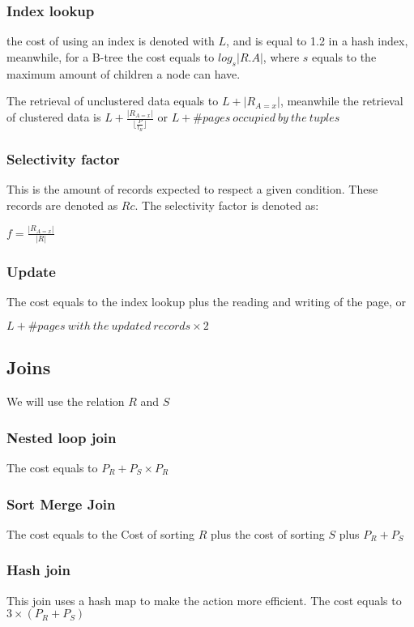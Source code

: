\documentclass[12pt, a4paper]{article}
\begin{document}
\subsubsection*{Index lookup}
the cost of using an index is denoted with $L$, and is equal to 1.2 in a hash index, meanwhile, for a B-tree the cost equals 
to $log_{s}|R.A|$, where $s$ equals to the maximum amount of children a node can have.

The retrieval of unclustered data equals to $L + |R_{A=x}|$, meanwhile the retrieval of clustered data is 
$L + \frac{|R_{A=x}|}{\lfloor\frac{P}{t_{R}}\rfloor}$ or $L + \# pages\ occupied\ by\ the\ tuples$

\subsubsection*{Selectivity factor}
This is the amount of records expected to respect a given condition. These records are denoted as $Rc$. The selectivity
factor is denoted as:
\begin{center}
    $f = \frac{|R_{A=x}|}{|R|}$ 
\end{center}

\subsubsection*{Update}
The cost equals to the index lookup plus the reading and writing of the page, or 
\begin{center}
    $L + \# pages\ with\ the\ updated\ records\times 2$    
\end{center}

\subsection{Joins}
We will use the relation $R$ and $S$
\subsubsection*{Nested loop join}
The cost equals to $P_{R}+P_{S}\times P_{R}$

\subsubsection{Sort Merge Join}
The cost equals to the Cost of sorting $R$ plus the cost of sorting $S$ plus $P_{R}+P_{S}$

\subsubsection*{Hash join}
This join uses a hash map to make the action more efficient. The cost equals to $3\times(P_{R}+P_{S})$
\end{document}
